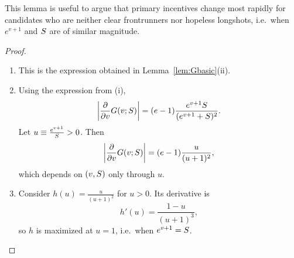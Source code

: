 This lemma is useful to argue that primary incentives change most rapidly for
candidates who are neither clear frontrunners nor hopeless longshots, i.e.\ when $e^{v+1}$ and $S$
are of similar magnitude.


\begin{proof}
\begin{enumerate}
    \item This is the expression obtained in Lemma~\ref{lem:Gbasic}(ii).
    \item Using the expression from (i),
    \[
        \left|\frac{\partial}{\partial v}G\!\left(v;S\right)\right|
        =(e-1)\frac{e^{v+1}S}{(e^{v+1}+S)^2}.
    \]
    Let $u\equiv \frac{e^{v+1}}{S}>0$. Then
    \[
        \left|\frac{\partial}{\partial v}G\!\left(v;S\right)\right|
        =(e-1)\frac{u}{(u+1)^2},
    \]
    which depends on $(v,S)$ only through $u$.
    \item Consider $h(u)=\frac{u}{(u+1)^2}$ for $u>0$. Its derivative is
    \[
        h'(u)=\frac{1-u}{(u+1)^3},
    \]
    so $h$ is maximized at $u=1$, i.e.\ when $e^{v+1}=S$.
\end{enumerate}
\end{proof}